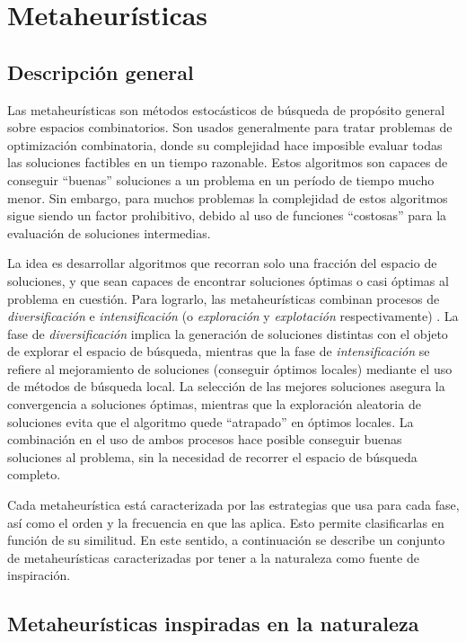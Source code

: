 \chapter{Metaheurísticas}
\label{capitulo2}

\section{Descripción general}

Las metaheurísticas son métodos estocásticos de búsqueda de propósito general sobre espacios combinatorios. Son usados generalmente para tratar problemas de optimización combinatoria, donde su complejidad hace imposible evaluar todas las soluciones factibles en un tiempo razonable. Estos algoritmos son capaces de conseguir ``buenas'' soluciones a un problema en un período de tiempo mucho menor. Sin embargo, para muchos problemas la complejidad de estos algoritmos sigue siendo un factor prohibitivo, debido al uso de funciones ``costosas'' para la evaluación de soluciones intermedias.

La idea es desarrollar algoritmos que recorran solo una fracción del espacio de soluciones, y que sean capaces de encontrar soluciones óptimas o casi óptimas al problema en cuestión. Para lograrlo, las metaheurísticas combinan procesos de \emph{diversificación} e \emph{intensificación} (o \emph{exploración} y \emph{explotación} respectivamente) \cite{Yang:2008:NMA:1628847}. La fase de \emph{diversificación} implica la generación de soluciones distintas con el objeto de explorar el espacio de búsqueda, mientras que la fase de \emph{intensificación} se refiere al mejoramiento de soluciones (conseguir óptimos locales) mediante el uso de métodos de búsqueda local. La selección de las mejores soluciones asegura la convergencia a soluciones óptimas, mientras que la exploración aleatoria de soluciones evita que el algoritmo quede ``atrapado'' en óptimos locales. La combinación en el uso de ambos procesos hace posible conseguir buenas soluciones al problema, sin la necesidad de recorrer el espacio de búsqueda completo.

Cada metaheurística está caracterizada por las estrategias que usa para cada fase, así como el orden y la frecuencia en que las aplica. Esto permite clasificarlas en función de su similitud. En este sentido, a continuación se describe un conjunto de metaheurísticas caracterizadas por tener a la naturaleza como fuente de inspiración.

\section{Metaheurísticas inspiradas en la naturaleza}

